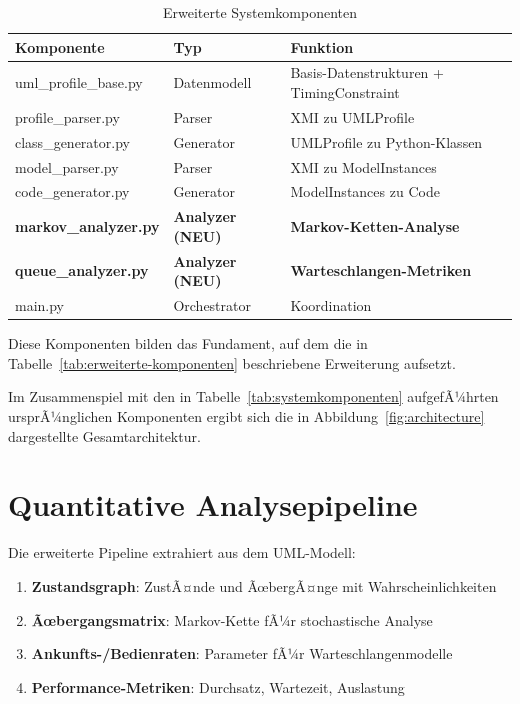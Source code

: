 ﻿\documentclass[a4paper,12pt]{report}
\theoremstyle{definition}
\begin{document}
\begin{table}[H]
	\centering
	\begin{tabular}{@{}llp{6cm}@{}}
		\toprule
		\textbf{Komponente} & \textbf{Typ} & \textbf{Funktion} \\
		\midrule
		uml\_profile\_base.py & Datenmodell & Basis-Datenstrukturen + TimingConstraint \\
		profile\_parser.py & Parser & XMI zu UMLProfile \\
		class\_generator.py & Generator & UMLProfile zu Python-Klassen \\
		model\_parser.py & Parser & XMI zu ModelInstances \\
		code\_generator.py & Generator & ModelInstances zu Code \\
		\textbf{markov\_analyzer.py} & \textbf{Analyzer (NEU)} & \textbf{Markov-Ketten-Analyse} \\
		\textbf{queue\_analyzer.py} & \textbf{Analyzer (NEU)} & \textbf{Warteschlangen-Metriken} \\
		main.py & Orchestrator & Koordination \\
		\bottomrule
	\end{tabular}
	\caption{Erweiterte Systemkomponenten}
\label{tab:erweiterte-komponenten}
	\label{tab:components-extended}
\end{table}

Diese Komponenten bilden das Fundament, auf dem die in Tabelle~\ref{tab:erweiterte-komponenten} beschriebene Erweiterung aufsetzt.

Im Zusammenspiel mit den in Tabelle~\ref{tab:systemkomponenten} aufgefÃ¼hrten ursprÃ¼nglichen Komponenten ergibt sich die in Abbildung~\ref{fig:architecture} dargestellte Gesamtarchitektur.

\section{Quantitative Analysepipeline}

Die erweiterte Pipeline extrahiert aus dem UML-Modell:

\begin{enumerate}
	\item[-] \textbf{Zustandsgraph}: ZustÃ¤nde und ÃœbergÃ¤nge mit Wahrscheinlichkeiten
	\item[-] \textbf{Ãœbergangsmatrix}: Markov-Kette fÃ¼r stochastische Analyse
	\item[-] \textbf{Ankunfts-/Bedienraten}: Parameter fÃ¼r Warteschlangenmodelle
	\item[-] \textbf{Performance-Metriken}: Durchsatz, Wartezeit, Auslastung
\end{enumerate}
\end{document}
